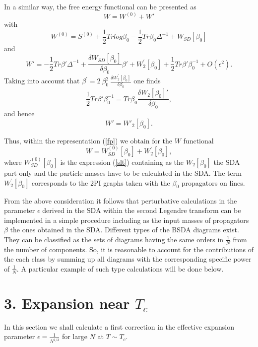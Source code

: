 \documentclass[a4paper,12pt]{article}
\begin{document}
In a similar way, the free energy functional can be presented as
\begin{equation} \label{fe}
W = W^{(0)} + W'
\end{equation}
with
\begin{equation} \label{fe0}
 W^{(0)} = S^{(0)} + \frac{1}{2} Tr log \beta_0 - \frac{1}{2} Tr
 \beta_0 \Delta^{-1} + W_{SD} [\beta_0]
\end{equation}
and
\begin{equation} \label{fe1}
 W' = - \frac{1}{2} Tr \beta ' \Delta^{-1} + \frac{\delta
 W_{SD}[\beta_0] }{\delta \beta_0} \beta {'} + W_2^{'}[\beta_0]
 +\frac{1}{2} Tr \beta ' \beta^{-1}_0 + O(\epsilon^2).
\end{equation}
Taking into account that $\beta^{'} = 2 ~\beta_0^2 ~ \frac{\delta
W^{'}_{2}[\beta_0] }{\delta \beta_0}$ one finds
\begin{equation} \label{fe2}
\frac{1}{2} Tr \beta ' \beta^{-1}_0 = Tr \beta_0 \frac{\delta
W_{2}[\beta_0]' }{\delta \beta_0 },
\end{equation}
and hence
\begin{equation} \label{fe3}
W ' = W '_2[\beta_0].
\end{equation}

Thus, within the representation (\ref{fp}) we obtain for the $W$
functional
\begin{equation} \label{slt1}
W = W_{SD}^{(0)}[\beta_0] + W_2^{'}[\beta_0],
\end{equation}
where $ W_{SD}^{(0)}[\beta_0]$ is the expression (\ref{slt})
containing as the $W_2[\beta_0]$ the SDA part only and the particle
masses have to be calculated in the SDA. The term $W_2^{'}[\beta_0]$
corresponds to the 2PI graphs taken with the $\beta_0$ propagators on
lines.


From the above consideration it follows that perturbative calculations
in the parameter $\epsilon$ derived in the SDA within the second
Legendre transform can be implemented in a simple procedure including
as the input masses of propagators $\beta$ the ones obtained in the
SDA. Different types of the BSDA diagrams exist.  They can be
classified as the sets of diagrams having the same orders in
$\frac{1}{N}$ from the number of components. So, it is reasonable to
account for the contributions of the each class by summing up all
diagrams with the corresponding specific power of $\frac{1}{N}$. A
particular example of such type calculations will be done below.

\section*{3. Expansion near $T_c$}
In this section we shall calculate a first correction in the effective
expansion parameter $\epsilon = \frac{1}{N^{1/3}}$ for large $N$ at $T
\sim T_c$.
\end{document}
